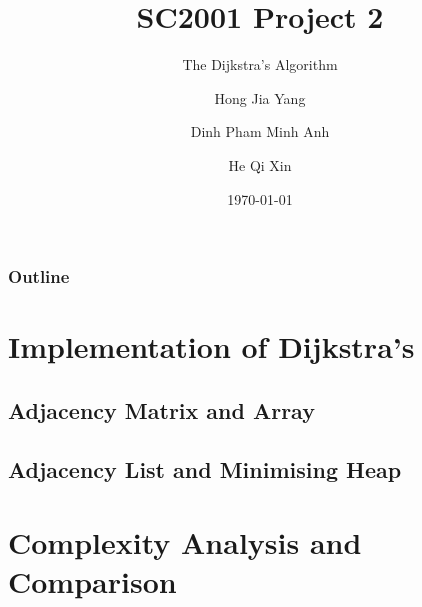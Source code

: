\documentclass{beamer}
\title{SC2001 Project 2}
\subtitle{The Dijkstra's Algorithm}
\author[Hong, Dinh, He]{Hong Jia Yang \and Dinh Pham Minh Anh \and He Qi Xin}
\institute{Team 4}
\date{\today}
\begin{document}
\begin{frame}
	\titlepage
\end{frame}

\begin{frame}
	\frametitle{Outline}
	\tableofcontents
\end{frame}

\section{Implementation of Dijkstra's}
\subsection{Adjacency Matrix and Array}
\begin{frame}
	
\end{frame}

\subsection{Adjacency List and Minimising Heap}
\begin{frame}
	
\end{frame}

\section{Complexity Analysis and Comparison}
\begin{frame}
	
\end{frame}
\end{document}
